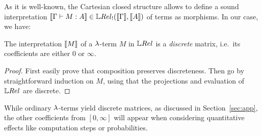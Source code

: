 
As it is well-known, the Cartesian closed structure %
allows to define a sound interpretation $\model{\Gamma\vdash M:A}\in\HOM{\LREL_{!}}{\model \Gamma}{\model A}$ of terms as morphisms.
In our case, we have:

\begin{proposition}\label{prop:descrete}
 The interpretation $\llbracket M\rrbracket$ of a $\lambda$-term $M$ in $\LREL$ is a \emph{discrete} matrix, i.e.\ its coefficients are either $0$ or $\infty$.
\end{proposition}
\begin{proof}
 First easily prove that composition preserves discreteness.
 Then go by straightforward induction on $M$, using that the projections and evaluation of  $\LREL$ are discrete.
\end{proof}

While ordinary $\lambda$-terms yield discrete matrices, 
as discussed in Section~\ref{sec:app}, the other coefficients from $[0,\infty]$ will appear when considering quantitative effects like computation steps or probabilities.


